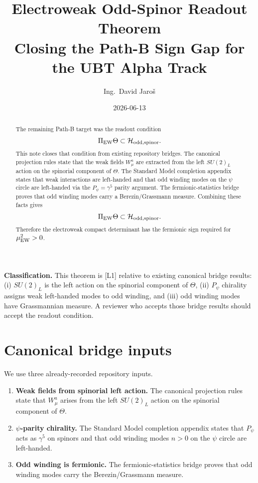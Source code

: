 \documentclass[12pt,a4paper]{article}
\title{Electroweak Odd-Spinor Readout Theorem\\
       \large Closing the Path-B Sign Gap for the UBT Alpha Track}
\author{Ing.\ David Jaro\v{s}}
\date{2026-06-13}
\begin{document}
\maketitle
\fi

\begin{abstract}
The remaining Path-B target was the readout condition
\[
  \Pi_{\rm EW}\Theta\subset\mathcal H_{\rm odd,spinor}.
\]
This note closes that condition from existing repository bridges.  The canonical
projection rules state that the weak fields $W_\mu^a$ are extracted from the
left $SU(2)_L$ action on the spinorial component of $\Theta$.  The Standard
Model completion appendix states that weak interactions are left-handed and that
odd winding modes on the $\psi$ circle are left-handed via the $P_\psi=\gamma^5$
parity argument.  The fermionic-statistics bridge proves that odd winding modes
carry a Berezin/Grassmann measure.  Combining these facts gives
\[
  \Pi_{\rm EW}\Theta\subset\mathcal H_{\rm odd,spinor}.
\]
Therefore the electroweak compact determinant has the fermionic sign required for
$\mu_{\rm EW}^2>0$.
\end{abstract}

\begin{statusbox}
\textbf{Classification.} This theorem is [L1] relative to existing canonical
bridge results: (i) $SU(2)_L$ is the left action on the spinorial component of
$\Theta$, (ii) $P_\psi$ chirality assigns weak left-handed modes to odd
winding, and (iii) odd winding modes have Grassmannian measure.  A reviewer who
accepts those bridge results should accept the readout condition.
\end{statusbox}

\section{Canonical bridge inputs}

We use three already-recorded repository inputs.

\begin{enumerate}
  \item \textbf{Weak fields from spinorial left action.}
  The canonical projection rules state that $W_\mu^a$ arises from the left
  $SU(2)_L$ action on the spinorial component of $\Theta$.

  \item \textbf{$\psi$-parity chirality.}
  The Standard Model completion appendix states that $P_\psi$ acts as
  $\gamma^5$ on spinors and that odd winding modes $n>0$ on the $\psi$ circle
  are left-handed.

  \item \textbf{Odd winding is fermionic.}
  The fermionic-statistics bridge proves that odd winding modes carry the
  Berezin/Grassmann measure.
\end{enumerate}
\end{document}
